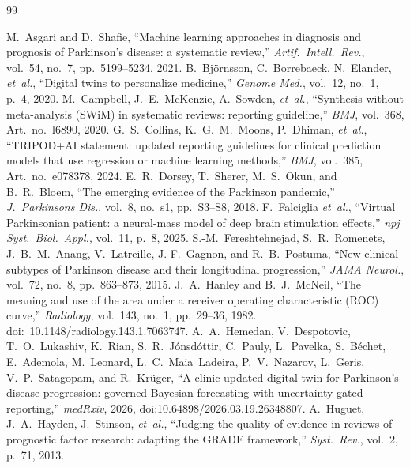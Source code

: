 \begin{thebibliography}{99}

M.~Asgari and D.~Shafie, ``Machine learning approaches in diagnosis and prognosis of Parkinson's disease: a systematic review,'' \textit{Artif.\ Intell.\ Rev.}, vol.~54, no.~7, pp.~5199--5234, 2021.
B.~Bj{\"o}rnsson, C.~Borrebaeck, N.~Elander, \textit{et~al.}, ``Digital twins to personalize medicine,'' \textit{Genome Med.}, vol.~12, no.~1, p.~4, 2020.
M.~Campbell, J.~E.~McKenzie, A.~Sowden, \textit{et~al.}, ``Synthesis without meta-analysis (SWiM) in systematic reviews: reporting guideline,'' \textit{BMJ}, vol.~368, Art.\ no.~l6890, 2020.
G.~S.~Collins, K.~G.~M.~Moons, P.~Dhiman, \textit{et~al.}, ``TRIPOD+AI statement: updated reporting guidelines for clinical prediction models that use regression or machine learning methods,'' \textit{BMJ}, vol.~385, Art.\ no.~e078378, 2024.
E.~R.~Dorsey, T.~Sherer, M.~S.~Okun, and B.~R.~Bloem, ``The emerging evidence of the Parkinson pandemic,'' \textit{J.\ Parkinsons Dis.}, vol.~8, no.~s1, pp.~S3--S8, 2018.
F.~Falciglia \textit{et~al.}, ``Virtual Parkinsonian patient: a neural-mass model of deep brain stimulation effects,'' \textit{npj Syst.\ Biol.\ Appl.}, vol.~11, p.~8, 2025.
S.-M.~Fereshtehnejad, S.~R.~Romenets, J.~B.~M.~Anang, V.~Latreille, J.-F.~Gagnon, and R.~B.~Postuma, ``New clinical subtypes of Parkinson disease and their longitudinal progression,'' \textit{JAMA Neurol.}, vol.~72, no.~8, pp.~863--873, 2015.
J.~A.~Hanley and B.~J.~McNeil, ``The meaning and use of the area under a receiver operating characteristic (ROC) curve,'' \textit{Radiology}, vol.~143, no.~1, pp.~29--36, 1982. doi:~10.1148/radiology.143.1.7063747.
A.~A.~Hemedan, V.~Despotovic, T.~O.~Lukashiv, K.~Rian, S.~R.~J{\'o}nsd{\'o}ttir, C.~Pauly, L.~Pavelka, S.~B{\'e}chet, E.~Ademola, M.~Leonard, L.~C.~Maia~Ladeira, P.~V.~Nazarov, L.~Geris, V.~P.~Satagopam, and R.~Kr{\"u}ger, ``A clinic-updated digital twin for Parkinson's disease progression: governed Bayesian forecasting with uncertainty-gated reporting,'' \textit{medRxiv}, 2026, doi:10.64898/2026.03.19.26348807.
A.~Huguet, J.~A.~Hayden, J.~Stinson, \textit{et~al.}, ``Judging the quality of evidence in reviews of prognostic factor research: adapting the GRADE framework,'' \textit{Syst.\ Rev.}, vol.~2, p.~71, 2013.


\end{thebibliography}

